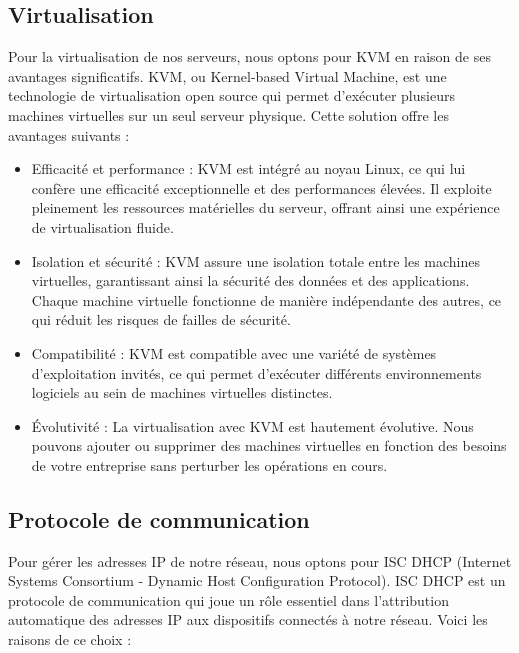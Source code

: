 \subsection{Virtualisation}

Pour la virtualisation de nos serveurs, nous optons pour KVM en raison de ses avantages significatifs. KVM, ou Kernel-based Virtual Machine, est une technologie de virtualisation open source qui permet d'exécuter plusieurs machines virtuelles sur un seul serveur physique. Cette solution offre les avantages suivants :

\begin{itemize}

\item Efficacité et performance : KVM est intégré au noyau Linux, ce qui lui confère une efficacité exceptionnelle et des performances élevées. Il exploite pleinement les ressources matérielles du serveur, offrant ainsi une expérience de virtualisation fluide.\\

\item Isolation et sécurité : KVM assure une isolation totale entre les machines virtuelles, garantissant ainsi la sécurité des données et des applications. Chaque machine virtuelle fonctionne de manière indépendante des autres, ce qui réduit les risques de failles de sécurité.\\

\item Compatibilité : KVM est compatible avec une variété de systèmes d'exploitation invités, ce qui permet d'exécuter différents environnements logiciels au sein de machines virtuelles distinctes.\\

\item Évolutivité : La virtualisation avec KVM est hautement évolutive. Nous pouvons ajouter ou supprimer des machines virtuelles en fonction des besoins de votre entreprise sans perturber les opérations en cours.\\

\end{itemize}
\subsection{Protocole de communication}

Pour gérer les adresses IP de notre réseau, nous optons pour ISC DHCP (Internet Systems Consortium - Dynamic Host Configuration Protocol). ISC DHCP est un protocole de communication qui joue un rôle essentiel dans l'attribution automatique des adresses IP aux dispositifs connectés à notre réseau. Voici les raisons de ce choix :


